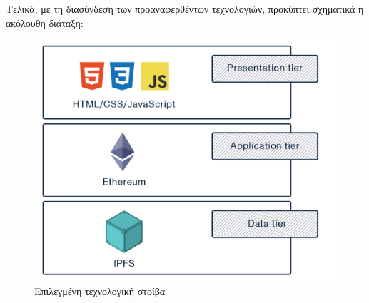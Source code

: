 \newpage
Τελικά, με τη διασύνδεση των προαναφερθέντων τεχνολογιών, προκύπτει σχηματικά η ακόλουθη διάταξη:

\vspace{.5\baselineskip}

\begin{figure}[H]
    \centering
    \includegraphics[width=.55\textwidth]{assets/figures/chapter-3/3.2.technology.stack}
    \caption{Επιλεγμένη τεχνολογική στοίβα}
\end{figure}
